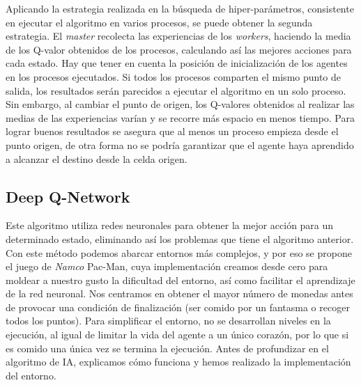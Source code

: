 		Aplicando la estrategia realizada en la búsqueda de hiper-parámetros, consistente en ejecutar el algoritmo en varios procesos, se puede obtener la segunda estrategia. El \textit{master} recolecta las experiencias de los \textit{workers}, haciendo la media de los Q-valor obtenidos de los procesos, calculando así las mejores acciones para cada estado. Hay que tener en cuenta la posición de inicialización de los agentes en los procesos ejecutados. Si todos los procesos comparten el mismo punto de salida, los resultados serán parecidos a ejecutar el algoritmo en un solo proceso. Sin embargo, al cambiar el punto de origen, los Q-valores obtenidos al realizar las medias de las experiencias varían y se recorre más espacio en menos tiempo. Para lograr buenos resultados se asegura que al menos un proceso empieza desde el punto origen, de otra forma no se podría garantizar que el agente haya aprendido a alcanzar el destino desde la celda origen.			
			
			
	
	
	
	
	\subsection{Deep Q-Network}
	\label{cap:3_3_2}
		Este algoritmo utiliza redes neuronales para obtener la mejor acción para un determinado estado, eliminando así los problemas que tiene el algoritmo anterior. Con este método podemos abarcar entornos más complejos, y por eso se propone el juego de \textit{Namco} Pac-Man, cuya implementación  creamos desde cero para moldear a nuestro gusto la dificultad del entorno, así como facilitar el aprendizaje de la red neuronal. Nos centramos en obtener el mayor número de monedas antes de provocar una condición de finalización (ser comido por un fantasma o recoger todos los puntos). Para simplificar el entorno, no se desarrollan niveles en la ejecución, al igual de limitar la vida del agente a un único corazón, por lo que si es comido una única vez se termina la ejecución. Antes de profundizar en el algoritmo de IA, explicamos cómo funciona y hemos realizado la implementación del entorno.
	
